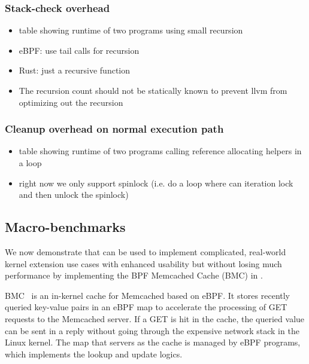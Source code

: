 \subsubsection{Stack-check overhead}
\begin{itemize}
    \item table showing runtime of two programs using small recursion
    \item eBPF: use tail calls for recursion
    \item Rust: just a recursive function
    \item The recursion count should not be statically known to prevent llvm
        from optimizing out the recursion
\end{itemize}

\subsubsection{Cleanup overhead on normal execution path}
\begin{itemize}
    \item table showing runtime of two programs calling reference allocating
        helpers in a loop
    \item right now we only support spinlock (i.e. do a loop where can
        iteration lock and then unlock the spinlock)
\end{itemize}

\subsection{Macro-benchmarks}
We now demonstrate that \projname{} can be used to implement complicated,
    real-world kernel extension use cases with enhanced usability but without
    losing much performance by implementing the BPF Memcached Cache (BMC) in
    \projname{}.

%

BMC~\cite{BMC} is an in-kernel cache for Memcached based on eBPF.
It stores recently queried key-value pairs in an eBPF map to accelerate the
    processing of GET requests to the Memcached server.
If a GET is hit in the cache, the queried value can be sent in a reply without
    going through the expensive network stack in the Linux kernel.
The map that servers as the cache is managed by eBPF programs, which implements
    the lookup and update logics.

